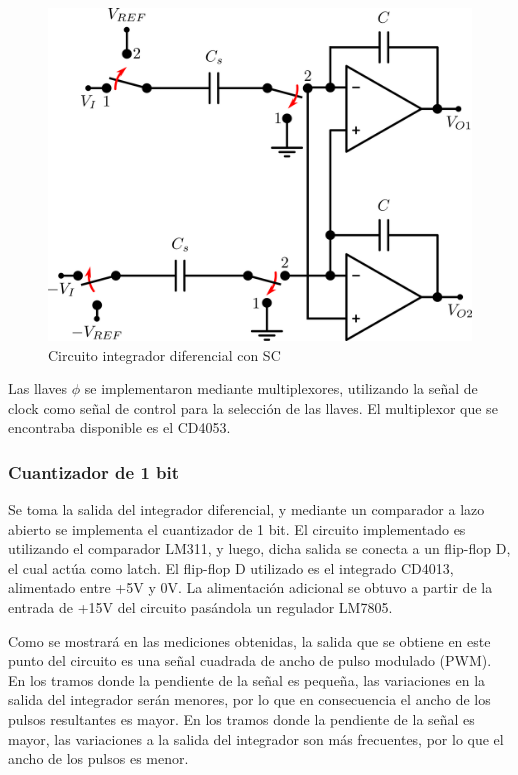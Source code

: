 \documentclass[assd_tp3_main.tex]{subfiles}
\begin{document}
\begin{figure}[!ht]
\begin{centering}
\includegraphics[scale=0.45]{images/ej5/IntegradorDifSC.png}
\par\end{centering}
\caption{Circuito integrador diferencial con SC}
\end{figure}

Las llaves $\phi$ se implementaron mediante multiplexores, utilizando la señal de clock como señal de control para la selección de las llaves. El multiplexor que se encontraba disponible es el CD4053.

\subsubsection{Cuantizador de 1 bit}

Se toma la salida del integrador diferencial, y mediante un comparador a lazo abierto se implementa el cuantizador de 1 bit. El circuito implementado es utilizando el comparador LM311, y luego, dicha salida se conecta a un flip-flop D, el cual actúa como latch. El flip-flop D utilizado es el integrado CD4013, alimentado entre +5V y 0V. La alimentación adicional se obtuvo a partir de la entrada de +15V del circuito pasándola un regulador LM7805.


Como se mostrará en las mediciones obtenidas, la salida que se obtiene en este punto del circuito es una señal cuadrada de ancho de pulso modulado (PWM). En los tramos donde la pendiente de la señal es pequeña, las variaciones en la salida del integrador serán menores, por lo que en consecuencia el ancho de los pulsos resultantes es mayor. En los tramos donde la pendiente de la señal es mayor, las variaciones a la salida del integrador son más frecuentes, por lo que el ancho de los pulsos es menor.
\end{document}
